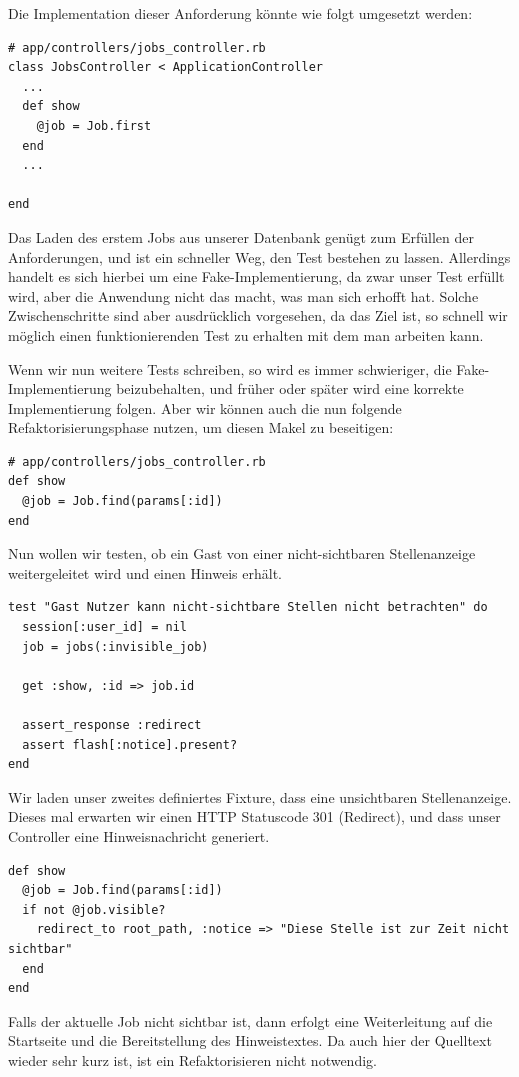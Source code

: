 Die Implementation dieser Anforderung könnte wie folgt umgesetzt werden:
\begin{lstlisting}
# app/controllers/jobs_controller.rb
class JobsController < ApplicationController
  ...
  def show
    @job = Job.first
  end
  ...
  
end
\end{lstlisting}
\tddgreen
Das Laden des erstem Jobs aus unserer Datenbank genügt zum Erfüllen der Anforderungen, und ist ein schneller Weg, den Test bestehen zu lassen. Allerdings handelt es sich hierbei um eine Fake-Implementierung, da zwar unser Test erfüllt wird, aber die Anwendung nicht das macht, was man sich erhofft hat. Solche Zwischenschritte sind aber ausdrücklich vorgesehen, da das Ziel ist, so schnell wir möglich einen funktionierenden Test zu erhalten mit dem man arbeiten kann.

Wenn wir nun weitere Tests schreiben, so wird es immer schwieriger, die Fake-Implementierung beizubehalten, und früher oder später wird eine korrekte Implementierung folgen. 
Aber wir können auch die nun folgende Refaktorisierungsphase nutzen, um diesen Makel zu beseitigen:
\tddrefactor
\begin{lstlisting}
# app/controllers/jobs_controller.rb
def show
  @job = Job.find(params[:id])
end
\end{lstlisting}

Nun wollen wir testen, ob ein Gast von einer nicht-sichtbaren Stellenanzeige weitergeleitet wird und einen Hinweis erhält.

\begin{lstlisting}
test "Gast Nutzer kann nicht-sichtbare Stellen nicht betrachten" do
  session[:user_id] = nil
  job = jobs(:invisible_job)
  
  get :show, :id => job.id

  assert_response :redirect
  assert flash[:notice].present?
end
\end{lstlisting}
\tddred

Wir laden unser zweites definiertes Fixture, dass eine unsichtbaren Stellenanzeige. Dieses mal erwarten wir einen HTTP Statuscode 301 (Redirect), und dass unser Controller eine Hinweisnachricht generiert.

\begin{lstlisting}
def show
  @job = Job.find(params[:id])
  if not @job.visible?
    redirect_to root_path, :notice => "Diese Stelle ist zur Zeit nicht sichtbar"
  end
end
\end{lstlisting}
\tddgreen
Falls der aktuelle Job nicht sichtbar ist, dann erfolgt eine Weiterleitung auf die Startseite und die Bereitstellung des Hinweistextes.
\tddrefactor
Da auch hier der Quelltext wieder sehr kurz ist, ist ein Refaktorisieren nicht notwendig.

